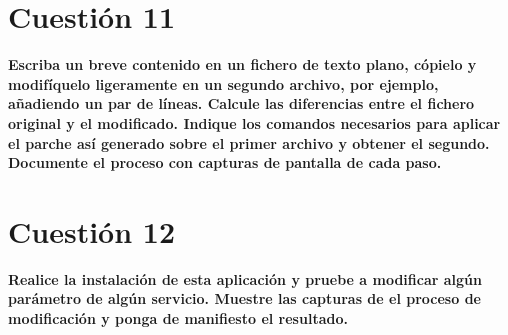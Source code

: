 \documentclass[a4paper,11pt]{article}
\newenvironment{answer}{%
\begin{list}{}{%
}%
\item[]}{\end{list}}
\begin{document}
\section{Cuestión 11}
\textbf{Escriba un breve contenido en un fichero de texto plano, cópielo y modifíquelo ligeramente en un segundo archivo, 
por ejemplo, añadiendo un par de líneas. Calcule las diferencias entre el fichero original y el modificado. Indique los
comandos necesarios para aplicar el parche así generado sobre el primer archivo y obtener el segundo. Documente el proceso 
con capturas de pantalla de cada paso.}
\begin{answer}
  
\end{answer}

\section{Cuestión 12}
\textbf{Realice la instalación de esta aplicación y pruebe a modificar algún parámetro de algún servicio. Muestre las 
capturas de el proceso de modificación y ponga de manifiesto el resultado.}
\begin{answer}
  
\end{answer}

\printbibliography
\end{document}
